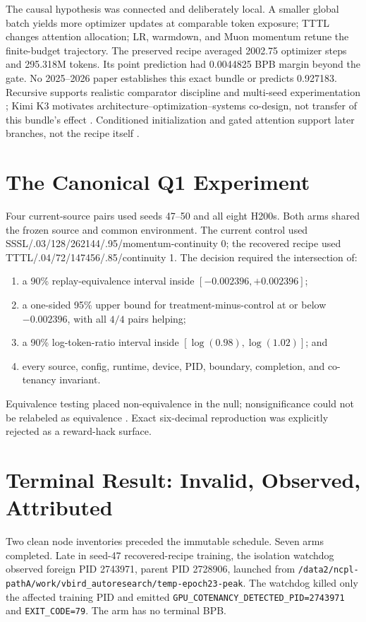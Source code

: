 \documentclass{article}
\begin{document}
The causal hypothesis was connected and deliberately local.  A smaller
global batch yields more optimizer updates at comparable token exposure;
TTTL changes attention allocation; LR, warmdown, and Muon momentum retune the
finite-budget trajectory.  The preserved recipe averaged 2002.75 optimizer
steps and 295.318M tokens.  Its point prediction had 0.0044825 BPB margin
beyond the gate.  No 2025--2026 paper establishes this exact bundle or
predicts 0.927183.  Recursive supports realistic comparator discipline and
multi-seed experimentation \cite{recursive2026}; Kimi K3 motivates
architecture--optimization--systems co-design, not transfer of this bundle's
effect \cite{kimik3}.  Conditioned initialization and gated attention support
later branches, not the recipe itself \cite{saratchandran2026conditioned,
qiu2025gated}.

\section{The Canonical Q1 Experiment}

Four current-source pairs used seeds 47--50 and all eight H200s.  Both arms
shared the frozen source and common environment.  The current control used
SSSL/.03/128/262144/.95/momentum-continuity 0; the recovered recipe used
TTTL/.04/72/147456/.85/continuity 1.  The decision required the intersection
of:
\begin{enumerate}
\item a 90\% replay-equivalence interval inside
$[-0.002396,+0.002396]$;
\item a one-sided 95\% upper bound for treatment-minus-control at or below
$-0.002396$, with all $4/4$ pairs helping;
\item a 90\% log-token-ratio interval inside
$[\log(0.98),\log(1.02)]$; and
\item every source, config, runtime, device, PID, boundary, completion, and
co-tenancy invariant.
\end{enumerate}
Equivalence testing placed non-equivalence in the null; nonsignificance could
not be relabeled as equivalence \cite{schuirmann1987,lakens2017}.  Exact
six-decimal reproduction was explicitly rejected as a reward-hack surface.

\section{Terminal Result: Invalid, Observed, Attributed}

Two clean node inventories preceded the immutable schedule.  Seven arms
completed.  Late in seed-47 recovered-recipe training, the isolation watchdog
observed foreign PID 2743971, parent PID 2728906, launched from
\texttt{/data2/ncpl-pathA/work/vbird\_autoresearch/temp-epoch23-peak}.
The watchdog killed only the affected training PID and emitted
\texttt{GPU\_COTENANCY\_DETECTED\_PID=2743971} and
\texttt{EXIT\_CODE=79}.  The arm has no terminal BPB.
\end{document}
